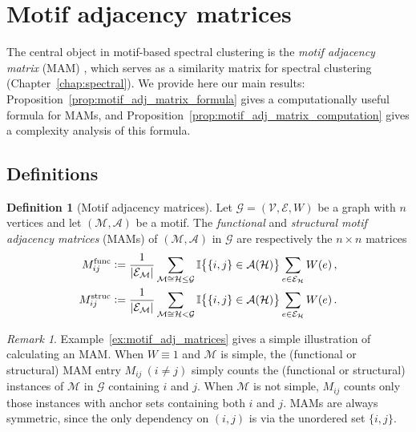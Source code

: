 \documentclass[12pt,draft]{ociamthesis}
\theoremstyle{plain}
\theoremstyle{definition}
\newtheorem{definition}{Definition}[chapter]
\theoremstyle{remark}
\newtheorem*{remark}{Remark}
\newcommand\bb[1]{\mathbb{#1}}
\newcommand\ca[1]{\mathcal{#1}}
\begin{document}
\section{Motif adjacency matrices} \label{sec:graphs_motif_adj_matrices}

The central object in motif-based spectral clustering is the \emph{motif
adjacency matrix} (MAM) \cite{benson2016higher}, which serves as a similarity
matrix for spectral clustering (Chapter~\ref{chap:spectral}).
We provide here our main results:
Proposition~\ref{prop:motif_adj_matrix_formula} gives a computationally useful
formula for MAMs, and Proposition~\ref{prop:motif_adj_matrix_computation} gives
a complexity analysis of this formula.

\pagebreak

\subsection{Definitions}

\begin{definition}[Motif adjacency matrices] \label{def:motif_adj_matrices}
  Let $\ca{G} = (\ca{V,E},W)$ be a graph with $n$ vertices and let $\ca{(M,A)}$
  be a motif. The \emph{functional} and \emph{structural motif adjacency
  matrices} (MAMs) of $\ca{(M,A)}$ in $\ca{G}$ are respectively the $n \times
  n$ matrices
  \begin{align*}
    M^\mathrm{func}_{i j} &\vcentcolon= \frac{1}{|\ca{E_M}|} \sum_{\ca{M} \cong
    \ca{H} \leq \ca{G}} \bb{I} \big\{ \{i,j\} \in \ca{A}(\ca{H}) \big\} \sum_{e
    \in \ca{E_H}} W(e)\,, \\
    M^\mathrm{struc}_{i j} &\vcentcolon= \frac{1}{|\ca{E_M}|} \sum_{\ca{M} \cong
    \ca{H} < \ca{G}} \bb{I} \big\{ \{i,j\} \in \ca{A}(\ca{H}) \big\} \sum_{e
    \in \ca{E_H}} W(e)\,.
  \end{align*}
\end{definition}

\begin{remark}
  Example~\ref{ex:motif_adj_matrices} gives a simple illustration of
  calculating an MAM.
  When $W \equiv 1$ and $\ca{M}$ is simple, the (functional or structural) MAM
  entry $M_{i j} \ (i \neq j)$ simply counts the (functional or structural)
  instances of $\ca{M}$ in $\ca{G}$ containing $i$ and $j$.
  When $\ca{M}$ is not simple, $M_{i j}$ counts only those instances with anchor
  sets containing both $i$ and $j$.
  MAMs are always symmetric, since the only dependency on $(i,j)$ is via the
  unordered set $\{i,j\}$.
\end{remark}
\end{document}
